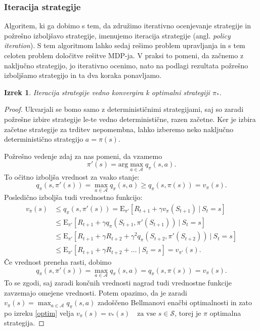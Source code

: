 \documentclass[12pt,a4paper]{amsart}
\theoremstyle{definition} %
\theoremstyle{plain} %
\newtheorem{izrek}[definicija]{Izrek}
\begin{document}
\subsubsection{Iteracija strategije}
Algoritem, ki ga dobimo s tem, da združimo iterativno ocenjevanje strategije in požrešno izboljšavo 
strategije, imenujemo iteracija strategije (angl. \textit{policy iteration}). S tem algoritmom 
lahko sedaj rešimo problem upravljanja in s tem celoten problem določitve rešitve MDP-ja. V praksi to pomeni, 
da začnemo z naključno strategijo, jo iterativno ocenimo, nato na podlagi rezultata požrešno izboljšamo 
strategijo in ta dva koraka ponavljamo.

\begin{izrek}\label{iterKonv}
    Iteracija strategije vedno konvergira k optimalni strategiji $\pi_*$.
\end{izrek}

\begin{proof}
    Ukvarjali se bomo samo z determinističnimi strategijami, saj so zaradi požrešne izbire 
    strategije le-te vedno deterministične, razen začetne. Ker je izbira začetne strategije za 
    trditev nepomembna, lahko izberemo neko naključno deterministično strategijo $a = \pi(s)$.

    Požrešno vedenje zdaj za nas pomeni, da vzamemo 
    \begin{equation}\label{pozresno}
        \pi'(s) = \text{arg}\max_{a \in \mathcal{A}} q_\pi(s, a).
    \end{equation}
    To očitno izboljša vrednost za vsako stanje:
    $$
    q_\pi(s, \pi'(s)) = \max_{a \in \mathcal{A}} q_\pi(s, a) \geq q_\pi(s, \pi(s)) = v_\pi(s).
    $$
    Posledično izboljša tudi vrednostno funkcijo: 
    \begin{align*}
        v_\pi(s) &\leq q_\pi(s, \pi'(s)) = \mathrm{E}_{\pi'} [R_{t+1} + 
            \gamma v_\pi(S_{t+1})~|~S_t = s] \\
        &\leq \mathrm{E}_{\pi'} [R_{t+1} + \gamma q_\pi(S_{t+1}, \pi'(S_{t+1}))~|~S_t = s] \\
        &\leq \mathrm{E}_{\pi'} [R_{t+1} + \gamma R_{t+2} + 
            \gamma^2 q_\pi(S_{t+2}, \pi'(S_{t+2}))~|~S_t = s] \\
        &\leq \mathrm{E}_{\pi'} [R_{t+1} + \gamma R_{t+2} + \dots~|~S_t = s] = v_{\pi'}(s).
    \end{align*}
Če vrednost preneha rasti, dobimo 
$$
q_\pi(s, \pi'(s)) = \max_{a \in \mathcal{A}} q_\pi(s, a) = q_\pi(s, \pi(s)) = v_\pi(s).
$$
To se zgodi, saj zaradi končnih vrednosti nagrad tudi vrednostne funkcije zavzemajo omejene vrednosti. 
Potem opazimo, da je zaradi $v_\pi(s) = \max_{a \in \mathcal{A}} q_\pi(s, a)$ zadoščeno Bellmanovi 
enačbi optimalnosti in zato po izreku \ref{optim} velja $v_\pi(s) = 
v_*(s) \text{ } \text{ za vse } s \in \mathcal{S}$, torej je $\pi$ optimalna strategija.
\end{proof}
\end{document}
